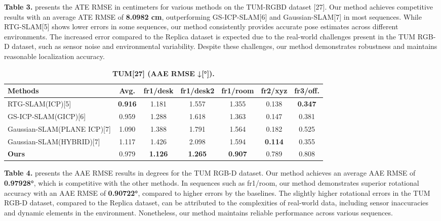 \documentclass[twocolumn]{article} %
\begin{document}
\textbf{Table 3.} presents the ATE RMSE in centimeters for various
methods on the TUM-RGBD dataset {[}27{]}. Our method achieves
competitive results with an average ATE RMSE of \textbf{8.0982 cm},
outperforming GS-ICP-SLAM{[}6{]} and Gaussian-SLAM{[}7{]} in most
sequences. While RTG-SLAM{[}5{]} shows lower errors in some sequences,
our method consistently provides accurate pose estimates across
different environments. The increased error compared to the Replica
dataset is expected due to the real-world challenges present in the TUM
RGB-D dataset, such as sensor noise and environmental variability.
Despite these challenges, our method demonstrates robustness and
maintains reasonable localization accuracy.

\begin{table}[htbp]
\renewcommand{\thetable}{\textbf{\arabic{table}}}
\renewcommand{\tablename}{\textbf{Table}}
\centering
\caption{\textbf{TUM[27] (AAE RMSE ↓[°]).}}
\label{table:_textbf_tum_27_aae_r}
\begin{adjustbox}{max width=\columnwidth,max height=!,center}
\begin{tabular}{lcccccc}
\toprule
\textbf{Methods} & \textbf{Avg.} & \textbf{fr1/desk} & \textbf{fr1/desk2} & \textbf{fr1/room} & \textbf{fr2/xyz} & \textbf{fr3/off.}\\
\midrule
RTG-SLAM(ICP)[5] & \cellcolor{green!30}\textbf{0.916} & \cellcolor{yellow!30}1.181 & \cellcolor{yellow!30}1.557 & \cellcolor{yellow!30}1.355 & \cellcolor{yellow!30}0.138 & \cellcolor{green!30}\textbf{0.347}\\
GS-ICP-SLAM(GICP)[6] & \cellcolor{yellow!30}0.959 & \cellcolor{lime!50}1.288 & \cellcolor{lime!50}1.618 & \cellcolor{lime!50}1.363 & \cellcolor{lime!50}0.147 & \cellcolor{lime!50}0.381\\
Gaussian-SLAM(PLANE ICP)[7] & 1.090 & 1.388 & 1.791 & 1.564 & 0.182 & 0.525\\
Gaussian-SLAM(HYBRID)[7] & 1.117 & 1.426 & 2.098 & 1.594 & \cellcolor{green!30}\textbf{0.114} & \cellcolor{yellow!30}0.355\\
\midrule
\textbf{Ours} & \cellcolor{lime!50}0.979 & \cellcolor{green!30}\textbf{1.126} & \cellcolor{green!30}\textbf{1.265} & \cellcolor{green!30}\textbf{0.907} & 0.789 & 0.808\\
\bottomrule
\end{tabular}
\end{adjustbox}
\end{table}

\textbf{Table 4.} presents the AAE RMSE results in degrees for the TUM
RGB-D dataset. Our method achieves an average AAE RMSE of
\textbf{0.97928°}, which is competitive with the other methods. In
sequences such as fr1/room, our method demonstrates superior rotational
accuracy with an AAE RMSE of \textbf{0.90722°}, compared to higher
errors by the baselines. The slightly higher rotational errors in the
TUM RGB-D dataset, compared to the Replica dataset, can be attributed to
the complexities of real-world data, including sensor inaccuracies and
dynamic elements in the environment. Nonetheless, our method maintains
reliable performance across various sequences.
\end{document}
